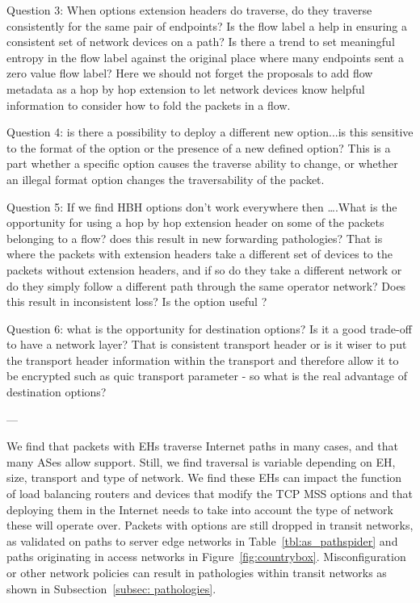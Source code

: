 \documentclass[conference]{IEEEtran}
\begin{document}
Question 3: When options extension headers do traverse, do they traverse consistently for the same pair of endpoints? Is the flow label a help in ensuring a consistent set of network devices on a path?
Is there a trend to set meaningful entropy in the flow label against the original place where many endpoints sent a zero value flow label?
Here we should not forget the proposals to add flow metadata as a hop by hop extension to let network devices know helpful information to consider how to fold the packets in a flow.


Question 4: is there a possibility to deploy a different new option...is this sensitive to the format of the option or the presence of a new defined option? This is a part whether a specific option causes the traverse ability to change, or whether an illegal format option changes the traversability of the packet.


Question 5: If we find HBH options don’t work everywhere then ….What is the opportunity for using a hop by hop extension header on some of the packets belonging to a flow? does this result in new forwarding pathologies? That is where the packets with extension headers take a different set of devices to the packets without extension headers, and if so do they take a different network or do they simply follow a different path through the same operator network? Does this result in inconsistent loss? Is the option useful ?


Question 6: what is the opportunity for destination options? Is it a good trade-off to have a network layer? That is consistent transport header or is it wiser to put the transport header information within the transport and therefore allow it to be encrypted such as quic transport parameter - so what is the real advantage of destination options?

---

We find that packets with EHs traverse Internet paths in many cases, and that many ASes allow support.
Still, we find traversal is variable depending on EH, size, transport and type of network. We find these EHs can impact the function of load balancing routers and devices that modify the TCP MSS options and that deploying them in the Internet needs to take into account the type of network these will operate over.
Packets with options are still dropped in transit networks, as validated on paths to server edge networks in Table~\ref{tbl:as_pathspider} and paths originating in access networks in Figure~\ref{fig:countrybox}. Misconfiguration or other network policies can result in pathologies within transit networks as shown in Subsection~\ref{subsec: pathologies}.
\end{document}
